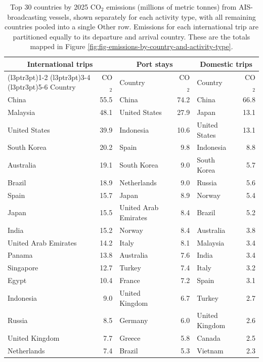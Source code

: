 \begin{table}[!h]
\centering
\caption{\label{tab:top_countries_by_activity_type}Top 30 countries by 2025 CO$_{2}$ emissions (millions of metric tonnes) from AIS-broadcasting vessels, shown separately for each activity type, with all remaining countries pooled into a single Other row. Emissions for each international trip are partitioned equally to its departure and arrival country. These are the totals mapped in Figure \ref{fig:fig-emissions-by-country-and-activity-type}.}
\centering
\fontsize{7}{9}\selectfont
\begin{tabular}[t]{lrlrlr}
\toprule
\multicolumn{2}{c}{International trips} & \multicolumn{2}{c}{Port stays} & \multicolumn{2}{c}{Domestic trips} \\
\cmidrule(l{3pt}r{3pt}){1-2} \cmidrule(l{3pt}r{3pt}){3-4} \cmidrule(l{3pt}r{3pt}){5-6}
Country & CO$_{2}$ & Country & CO$_{2}$ & Country & CO$_{2}$\\
\midrule
China & 55.5 & China & 74.2 & China & 66.8\\
Malaysia & 48.1 & United States & 27.9 & Japan & 13.1\\
United States & 39.9 & Indonesia & 10.6 & United States & 13.1\\
South Korea & 20.2 & Spain & 9.8 & Indonesia & 8.8\\
Australia & 19.1 & South Korea & 9.0 & South Korea & 5.7\\
\addlinespace
Brazil & 18.9 & Netherlands & 9.0 & Russia & 5.6\\
Spain & 15.7 & Japan & 8.9 & Norway & 5.4\\
Japan & 15.5 & United Arab Emirates & 8.4 & Brazil & 5.2\\
India & 15.2 & Norway & 8.4 & Australia & 3.8\\
United Arab Emirates & 14.2 & Italy & 8.1 & Malaysia & 3.4\\
\addlinespace
Panama & 13.8 & Australia & 7.6 & India & 3.4\\
Singapore & 12.7 & Turkey & 7.4 & Italy & 3.2\\
Egypt & 10.4 & France & 7.2 & Spain & 3.1\\
Indonesia & 9.0 & United Kingdom & 6.7 & Turkey & 2.7\\
Russia & 8.5 & Germany & 6.0 & United Kingdom & 2.6\\
\addlinespace
United Kingdom & 7.7 & Greece & 5.8 & Canada & 2.5\\
Netherlands & 7.4 & Brazil & 5.3 & Vietnam & 2.3\\

\end{tabular}
\end{table}
